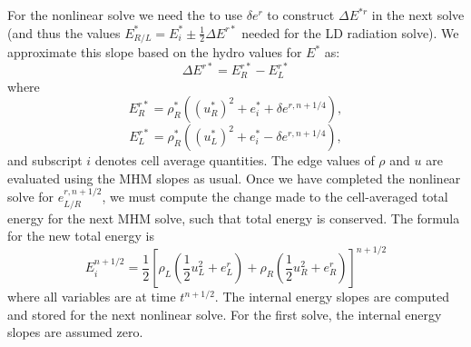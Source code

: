 \documentclass[preprint,12pt]{elsarticle}
\begin{document}
For the nonlinear solve we need the to use $\delta e^r$ to construct
$\Delta E^{*r}$ in the next solve (and thus the values $E^*_{R/L} = E^*_i \pm \frac{1}{2}\Delta E^{r*}$
needed for the LD radiation solve).  We approximate this slope based on the hydro values
for $E^*$ as:
\begin{equation}
    \Delta E^{r*} = E^{r*}_R - E^{r*}_L
\end{equation}
where 
\begin{equation}\label{estarr}
    E^{r*}_R = \rho^*_R\left((u_R^*)^2 + e^*_i +
    \delta e^{r,n+1/4}\right),
\end{equation}
\begin{equation}\label{estarl}
    E^{r*}_L = \rho^*_R\left((u_L^*)^2 + e^*_i -
    \delta e^{r,n+1/4}\right),
\end{equation}
and subscript $i$ denotes cell average quantities.  The edge values of $\rho$ and
$u$ are evaluated using the MHM slopes as usual.
 Once we have completed
the nonlinear solve for $e^{r,n+1/2}_{L/R}$, we must compute the change made to the
cell-averaged total energy for the next MHM solve, such that total energy is conserved. The formula for the new total energy is
\begin{equation}\label{ei}
    E^{n+1/2}_i = \frac{1}{2}\left[\rho_L\left(\frac{1}{2}u_L^2 + e_L^r\right)
    +\rho_R\left(\frac{1}{2}u_R^2 + e_R^r\right)\right]^{n+1/2}
\end{equation}
where all variables are at time $t^{n+1/2}$. The internal energy slopes are computed
and stored for the next nonlinear solve.  For the first solve, the internal energy
slopes are assumed zero.
\end{document}

